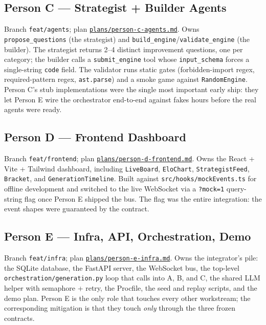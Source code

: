 \documentclass[11pt]{article}
\begin{document}
\subsection{Person C --- Strategist + Builder Agents}
Branch \texttt{feat/agents}; plan
\href{run:../plans/person-c-agents.md}{\texttt{plans/person-c-agents.md}}.
Owns \texttt{propose\_questions} (the strategist) and
\texttt{build\_engine}/\texttt{validate\_engine} (the builder). The
strategist returns 2--4 distinct improvement questions, one per
category; the builder calls a \texttt{submit\_engine} tool whose
\texttt{input\_schema} forces a single-string \texttt{code} field. The
validator runs static gates (forbidden-import regex, required-pattern
regex, \texttt{ast.parse}) and a smoke game against
\texttt{RandomEngine}. Person C's stub implementations were the single
most important early ship: they let Person E wire the orchestrator
end-to-end against fakes hours before the real agents were ready.

\subsection{Person D --- Frontend Dashboard}
Branch \texttt{feat/frontend}; plan
\href{run:../plans/person-d-frontend.md}{\texttt{plans/person-d-frontend.md}}.
Owns the React + Vite + Tailwind dashboard, including
\texttt{LiveBoard}, \texttt{EloChart}, \texttt{StrategistFeed},
\texttt{Bracket}, and \texttt{GenerationTimeline}. Built against
\texttt{src/hooks/mockEvents.ts} for offline development and switched
to the live WebSocket via a \texttt{?mock=1} query-string flag once
Person E shipped the bus. The flag was the entire integration: the
event shapes were guaranteed by the contract.

\subsection{Person E --- Infra, API, Orchestration, Demo}
Branch \texttt{feat/infra}; plan
\href{run:../plans/person-e-infra.md}{\texttt{plans/person-e-infra.md}}.
Owns the integrator's pile: the SQLite database, the FastAPI server,
the WebSocket bus, the top-level
\texttt{orchestration/generation.py} loop that calls into A, B, and
C, the shared LLM helper with semaphore + retry, the Procfile, the
seed and replay scripts, and the demo plan. Person E is the only role
that touches every other workstream; the corresponding mitigation is
that they touch \emph{only} through the three frozen contracts.
\end{document}
